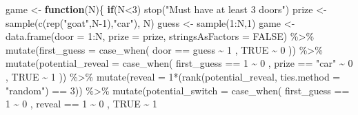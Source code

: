 \documentclass[
]{article}
\newenvironment{Shaded}{\begin{snugshade}}{\end{snugshade}}
\newcommand{\AttributeTok}[1]{\textcolor[rgb]{0.77,0.63,0.00}{#1}}
\newcommand{\ConstantTok}[1]{\textcolor[rgb]{0.00,0.00,0.00}{#1}}
\newcommand{\ControlFlowTok}[1]{\textcolor[rgb]{0.13,0.29,0.53}{\textbf{#1}}}
\newcommand{\DecValTok}[1]{\textcolor[rgb]{0.00,0.00,0.81}{#1}}
\newcommand{\FunctionTok}[1]{\textcolor[rgb]{0.00,0.00,0.00}{#1}}
\newcommand{\NormalTok}[1]{#1}
\newcommand{\OtherTok}[1]{\textcolor[rgb]{0.56,0.35,0.01}{#1}}
\newcommand{\SpecialCharTok}[1]{\textcolor[rgb]{0.00,0.00,0.00}{#1}}
\newcommand{\StringTok}[1]{\textcolor[rgb]{0.31,0.60,0.02}{#1}}
\begin{document}
\begin{Shaded}
\begin{Highlighting}[]
\NormalTok{game }\OtherTok{\textless{}{-}} \ControlFlowTok{function}\NormalTok{(N)\{}
  \ControlFlowTok{if}\NormalTok{(N}\SpecialCharTok{\textless{}}\DecValTok{3}\NormalTok{) }\FunctionTok{stop}\NormalTok{(}\StringTok{"Must have at least 3 doors"}\NormalTok{)}
\NormalTok{  prize }\OtherTok{\textless{}{-}} \FunctionTok{sample}\NormalTok{(}\FunctionTok{c}\NormalTok{(}\FunctionTok{rep}\NormalTok{(}\StringTok{"goat"}\NormalTok{,N}\DecValTok{{-}1}\NormalTok{),}\StringTok{"car"}\NormalTok{), N)}
\NormalTok{  guess }\OtherTok{\textless{}{-}} \FunctionTok{sample}\NormalTok{(}\DecValTok{1}\SpecialCharTok{:}\NormalTok{N,}\DecValTok{1}\NormalTok{)}
\NormalTok{  game }\OtherTok{\textless{}{-}} \FunctionTok{data.frame}\NormalTok{(}\AttributeTok{door =} \DecValTok{1}\SpecialCharTok{:}\NormalTok{N, }\AttributeTok{prize =}\NormalTok{ prize, }\AttributeTok{stringsAsFactors =} \ConstantTok{FALSE}\NormalTok{) }\SpecialCharTok{\%\textgreater{}\%} 
    \FunctionTok{mutate}\NormalTok{(}\AttributeTok{first\_guess =} \FunctionTok{case\_when}\NormalTok{(}
\NormalTok{      door }\SpecialCharTok{==}\NormalTok{ guess }\SpecialCharTok{\textasciitilde{}} \DecValTok{1}
\NormalTok{      , }\ConstantTok{TRUE} \SpecialCharTok{\textasciitilde{}} \DecValTok{0}
\NormalTok{    )) }\SpecialCharTok{\%\textgreater{}\%} 
    \FunctionTok{mutate}\NormalTok{(}\AttributeTok{potential\_reveal =} \FunctionTok{case\_when}\NormalTok{(}
\NormalTok{        first\_guess }\SpecialCharTok{==} \DecValTok{1} \SpecialCharTok{\textasciitilde{}} \DecValTok{0}
\NormalTok{      , prize }\SpecialCharTok{==} \StringTok{"car"} \SpecialCharTok{\textasciitilde{}} \DecValTok{0}
\NormalTok{      , }\ConstantTok{TRUE} \SpecialCharTok{\textasciitilde{}} \DecValTok{1}
\NormalTok{    )) }\SpecialCharTok{\%\textgreater{}\%} 
    \FunctionTok{mutate}\NormalTok{(}\AttributeTok{reveal =} \DecValTok{1}\SpecialCharTok{*}\NormalTok{(}\FunctionTok{rank}\NormalTok{(potential\_reveal, }\AttributeTok{ties.method =} \StringTok{"random"}\NormalTok{) }\SpecialCharTok{==} \DecValTok{3}\NormalTok{)) }\SpecialCharTok{\%\textgreater{}\%} 
    \FunctionTok{mutate}\NormalTok{(}\AttributeTok{potential\_switch =} \FunctionTok{case\_when}\NormalTok{(}
\NormalTok{      first\_guess }\SpecialCharTok{==} \DecValTok{1} \SpecialCharTok{\textasciitilde{}} \DecValTok{0}
\NormalTok{      , reveal }\SpecialCharTok{==} \DecValTok{1} \SpecialCharTok{\textasciitilde{}} \DecValTok{0}
\NormalTok{      , }\ConstantTok{TRUE} \SpecialCharTok{\textasciitilde{}} \DecValTok{1}

\end{Highlighting}
\end{Shaded}
\end{document}
